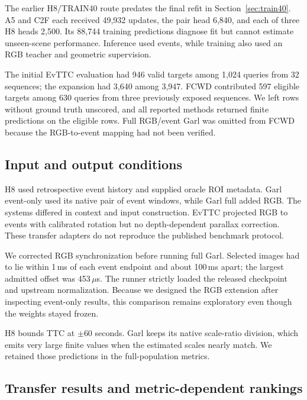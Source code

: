 The earlier H8/TRAIN40 route predates the final refit in Section~\ref{sec:train40}. A5 and C2F each received 49,932 updates, the pair head 6,840, and each of three H8 heads 2,500. Its 88,744 training predictions diagnose fit but cannot estimate unseen-scene performance. Inference used events, while training also used an RGB teacher and geometric supervision. 

The initial EvTTC evaluation had 946 valid targets among 1,024 queries from 32 sequences; the expansion had 3,640 among 3,947. FCWD contributed 597 eligible targets among 630 queries from three previously exposed sequences. We left rows without ground truth unscored, and all reported methods returned finite predictions on the eligible rows. Full RGB/event Garl was omitted from FCWD because the RGB-to-event mapping had not been verified. 

\subsection{Input and output conditions}

H8 used retrospective event history and supplied oracle ROI metadata. Garl event-only used its native pair of event windows, while Garl full added RGB. The systems differed in context and input construction. EvTTC projected RGB to events with calibrated rotation but no depth-dependent parallax correction. These transfer adapters do not reproduce the published benchmark protocol.

We corrected RGB synchronization before running full Garl. Selected images had to lie within 1\,ms of each event endpoint and about 100\,ms apart; the largest admitted offset was 453\,$\mu$s. The runner strictly loaded the released checkpoint and upstream normalization. Because we designed the RGB extension after inspecting event-only results, this comparison remains exploratory even though the weights stayed frozen. 

H8 bounds TTC at $\pm60$ seconds. Garl keeps its native scale-ratio division, which emits very large finite values when the estimated scales nearly match. We retained those predictions in the full-population metrics.

\subsection{Transfer results and metric-dependent rankings}

